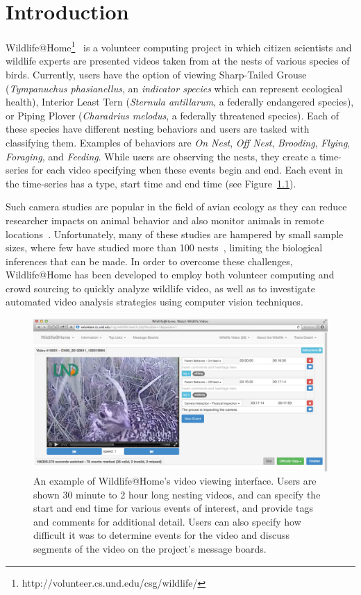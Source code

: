 \chapter{Introduction}
\label{ch:introduction}

Wildlife@Home\footnote{http://volunteer.cs.und.edu/csg/wildlife/}~\cite{desell_2013_wildlife, desell_iccs_wildlife_2015} is a volunteer computing project in which citizen scientists and wildlife experts are presented videos taken from at the nests of various species of birds. Currently, users have the option of viewing Sharp-Tailed Grouse (\textit{Tympanuchus phasianellus}, an \textit{indicator species} which can represent ecological health), Interior Least Tern (\textit{Sternula antillarum}, a federally endangered species), or Piping Plover (\textit{Charadrius melodus}, a federally threatened species). Each of these species have different nesting behaviors and users are tasked with classifying them. Examples of behaviors are \emph{On Nest}, \emph{Off Nest}, \emph{Brooding}, \emph{Flying}, \emph{Foraging}, and \emph{Feeding}. While users are observing the nests, they create a time-series for each video specifying when these events begin and end. Each event in the time-series has a type, start time and end time (see Figure~\ref{fig:wildlife_interface}).

Such camera studies are popular in the field of avian ecology as they can reduce researcher impacts on animal behavior and also monitor animals in remote locations~\cite{cox-etal-2012, ellis-felege-carroll-2012}. Unfortunately, many of these studies are hampered by small sample sizes, where few have studied more than 100 nests~\cite{ellis-felege-carroll-2012}, limiting the biological inferences that can be made. In order to overcome these challenges, Wildlife@Home has been developed to employ both volunteer computing and crowd sourcing to quickly analyze wildlife video, as well as to investigate automated video analysis strategies using computer vision techniques.

\begin{figure}
\centering
\includegraphics[width=5.8in]{./img/crowd_source_example_new.pdf}
\caption{An example of Wildlife@Home's video viewing interface. Users are shown 30 minute to 2 hour long nesting videos, and can specify the start and end time for various events of interest, and provide tags and comments for additional detail. Users can also specify how difficult it was to determine events for the video and discuss segments of the video on the project's message boards.}
\label{fig:wildlife_interface}
\end{figure}

